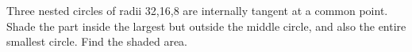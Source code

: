 Three nested circles of radii 32,16,8 are internally tangent at a common point. Shade the part inside the largest but outside the middle circle, and also the entire smallest circle. Find the shaded area.
